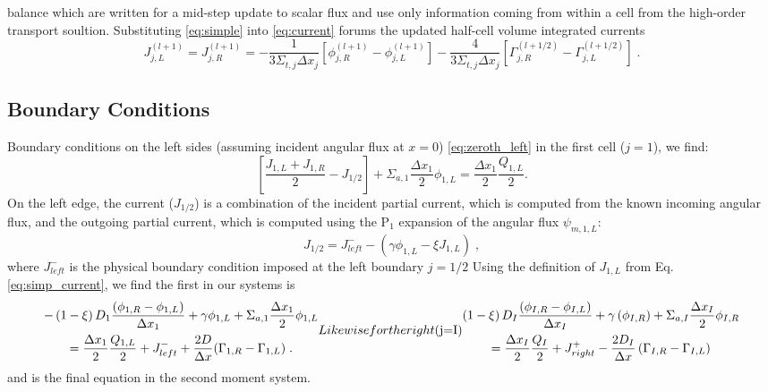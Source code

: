balance which are written for a mid-step update to scalar flux and use only information coming from within a cell from the high-order transport soultion.
Substituting \eqref{eq:simple} into \eqref{eq:current} forums the updated half-cell volume integrated currents 
\begin{equation}
\label{eq:simp_current}
    J_{j,L}^{(l+1)} = J_{j,R}^{(l+1)} = - \frac{1}{3 \Sigma_{t,j} \Delta x_j} \left[ \phi_{j,R}^{(l+1)} - \phi_{j,L}^{(l+1)} \right] - \frac{4}{3 \Sigma_{t,j} \Delta x_j} \left[ \Gamma_{j,R}^{(l+1/2)} - \Gamma_{j,L}^{(l+1/2)}  \right] \;.
\end{equation}


\subsection{Boundary Conditions}

Boundary conditions on the left sides (assuming incident angular flux at $x=0$) \eqref{eq:zeroth_left} in the first cell ($j=1$), we find:
\begin{equation}
 \left[ \frac{J_{1,L} + J_{1,R}}{2} - J_{1/2} \right] + \Sigma_{a,1} \frac{\Delta x_1}{2} \phi_{1,L} = \frac{\Delta x_1}{2} \frac{Q_{1,L}}{2}. 
\end{equation}
On the left edge, the current ($J_{1/2}$) is a combination of the incident partial current, which is computed from the known incoming angular flux, and the outgoing partial current, which is computed using the P$_1$ expansion of the angular flux $\psi_{m,1,L}$:
\begin{equation}
    J_{1/2}= J^{-}_{left} - \left(\gamma \phi_{1,L} - \xi J_{1,L}\right) \; ,
\end{equation}
where $J^{-}_{left}$ is the physical boundary condition imposed at the left boundary $j=1/2$
Using the definition of $J_{1,L}$ from Eq. \eqref{eq:simp_current}, we find the first in our systems is
\begin{subequations}
\label{eq:bc_inc}
\begin{multline}
    -\left(1-\xi \right) D_1 \frac{\left( \phi_{1,R} - \phi_{1,L} \right)}{\Delta x_1} +\gamma  \phi_{1,L}  + \Sigma_{a,1} \frac{\Delta x_1}{2} \phi_{1,L} 
    \\ = 
    \frac{\Delta x_1}{2} \frac{Q_{1,L}}{2} +J^{-}_{left}+ 
    \frac{2D}{\Delta x}(\Gamma_{1,R}-\Gamma_{1,L}) \; .
\end{multline}
Likewise for the right ($j=I$) 
\begin{multline}
    \left(1-\xi \right) D_I \frac{\left( \phi_{I,R} - \phi_{I,L} \right)}{\Delta x_I} +\gamma \left( \phi_{I,R}   \right)
    + \Sigma_{a,I} \frac{\Delta x_I}{2} \phi_{I,R}\\ = 
    \frac{\Delta x_I}{2}\frac{Q_I}{2} + J_{right}^+ - \frac{2 D_I}{\Delta x} \left( \Gamma_{I,R} - \Gamma_{I,L}\right)
\end{multline}
\end{subequations}
and is the final equation in the second moment system.

